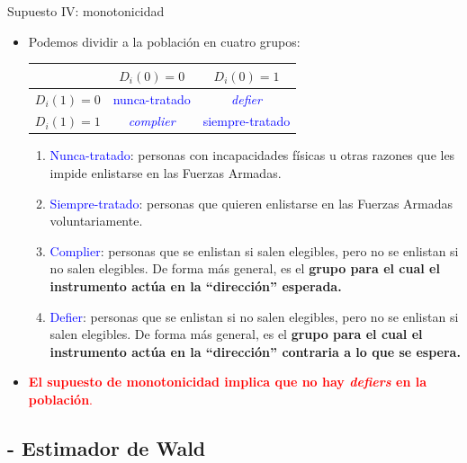 \documentclass[10pt, xcolor=dvipsnames]{beamer}
\begin{document}
\begin{frame}{Supuesto IV: monotonicidad}
	\begin{itemize}
		\item Podemos dividir a la población en cuatro grupos: \\ \vspace{0.2cm}	
	\begin{center}
		\begin{tabular}{ | l | c | c |}
			\hline
			& $D_i(0)=0$ & $D_i(0)=1$ \\ \hline		
			$D_i(1)=0$ & \textcolor{blue}{nunca-tratado} & \textcolor{blue}{\textit{defier}} \\ \hline
			$D_i(1)=1$ & \textcolor{blue}{\textit{complier}} & \textcolor{blue}{siempre-tratado} \\ \hline
		\end{tabular}
	\end{center}
\mediumspace
	\begin{enumerate}
	\fontvid
		\item \textcolor{blue}{Nunca-tratado}: personas con incapacidades físicas u otras razones que les impide enlistarse en las Fuerzas Armadas. 
		\item \textcolor{blue}{Siempre-tratado}: personas que quieren enlistarse en las Fuerzas Armadas voluntariamente.
		\item \textcolor{blue}{Complier}: personas que se enlistan si salen elegibles, pero no se enlistan si no salen elegibles. De forma más general, es el \textbf{grupo para el cual el instrumento actúa en la ``dirección'' esperada.}
		\item \textcolor{blue}{Defier}: personas que se enlistan si no salen elegibles, pero no se enlistan si salen elegibles. De forma más general, es el \textbf{grupo para el cual el instrumento actúa en la ``dirección'' contraria a lo que se espera.}	
	\end{enumerate}
	\smallspace
\item \textcolor{red}{\textbf{El supuesto de monotonicidad implica que no hay \textit{defiers} en la población}.}
	\end{itemize}
 \end{frame}


\subsection{- Estimador de Wald}
\end{document}
